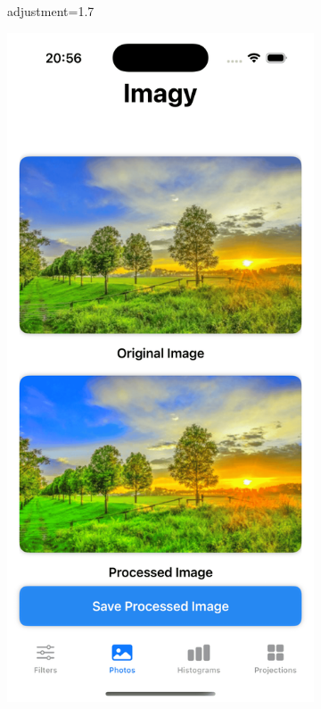 \documentclass[a4paper]{article}
\begin{document}
\begin{figure}[H]
\begin{subfigure}{0.2\textwidth}
        \caption{adjustment=1.7}
        \label{fig:dog_saturation_1}
    \end{subfigure}
    \hfill
    \begin{subfigure}{0.2\textwidth}
        \centering
        \includegraphics[width=\linewidth]{images/trees_saturation_1.7.png}

\end{subfigure}
\end{figure}
\end{document}
